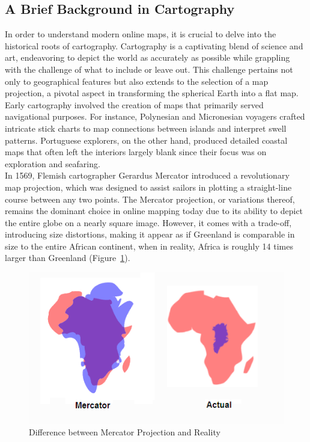 \documentclass[10pt,oneside,english,a4paper]{article}
\begin{document}
\subsection{A Brief Background in Cartography} \label{history:brief}
In order to understand modern online maps, it is crucial to delve into the historical roots of cartography. Cartography is a captivating blend of science and art, endeavoring to depict the world as accurately as possible while grappling with the challenge of what to include or leave out. This challenge pertains not only to geographical features but also extends to the selection of a map projection, a pivotal aspect in transforming the spherical Earth into a flat map.
\\Early cartography involved the creation of maps that primarily served navigational purposes. For instance, Polynesian and Micronesian voyagers crafted intricate stick charts to map connections between islands and interpret swell patterns. Portuguese explorers, on the other hand, produced detailed coastal maps that often left the interiors largely blank since their focus was on exploration and seafaring.
\\In 1569, Flemish cartographer Gerardus Mercator introduced a revolutionary map projection\cite{Forrest2021}, which was designed to assist sailors in plotting a straight-line course between any two points. The Mercator projection, or variations thereof, remains the dominant choice in online mapping today due to its ability to depict the entire globe on a nearly square image. However, it comes with a trade-off, introducing size distortions, making it appear as if Greenland is comparable in size to the entire African continent, when in reality, Africa is roughly 14 times larger than Greenland (Figure~\ref{fig:mercator}).

\begin{figure}[h]
	\centering
	\includegraphics[scale=0.5]{diagram4.png}
	\caption{Difference between Mercator Projection and Reality \cite{Forrest2021}}
	\label{fig:mercator}
\end{figure}
\end{document}
